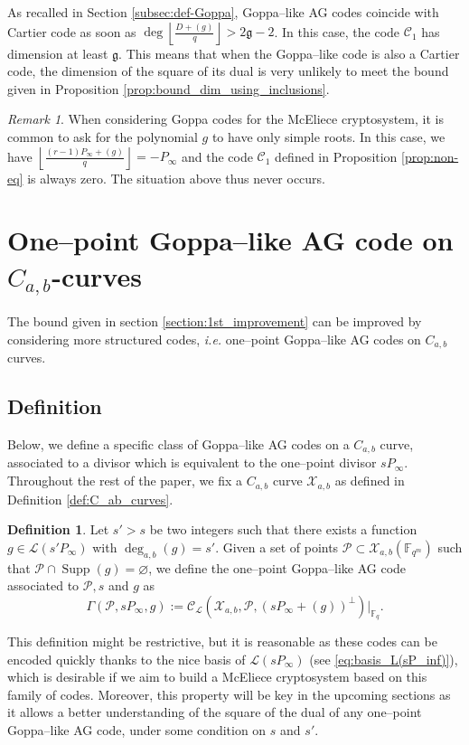 \documentclass[a4paper]{amsart}
\theoremstyle{definition}
\newtheorem{definition}[thm]{Definition}
\theoremstyle{remark}
\newtheorem{remark}[thm]{Remark}
\newcommand{\calP}{\mathcal{P}}
\newcommand{\calL}{\mathcal{L}}
\newcommand{\calC}{\mathcal{C}}
\newcommand{\calX}{\mathcal{X}}
\newcommand{\fq}{\mathbb{F}_{q}}
\newcommand{\F}{\mathbb{F}}
\newcommand{\Supp}{\operatorname{Supp}}
\newcommand{\degab}[1]{\deg_{a,b}\left(#1\right)}
\begin{document}
As recalled in Section \ref{subsec:def-Goppa}, Goppa--like AG codes coincide with Cartier code as soon as $\deg \left\lfloor \frac{D+(g)}{q} \right\rfloor > 2 \mathfrak{g}-2$. In this case, the code $\calC_1$ has dimension at least $\mathfrak{g}$. This means that when the Goppa--like code is also a Cartier code, the dimension of the square of its dual is very unlikely to meet the bound given in Proposition \ref{prop:bound_dim_using_inclusions}.

\begin{remark}
	When considering Goppa codes for the McEliece cryptosystem, it is common to ask for the polynomial $g$ to have only simple roots. In this case, we have $ \left\lfloor \frac{(r-1)P_\infty+(g)}{q} \right\rfloor = -P_\infty$ and the code $\calC_1$ defined in Proposition \ref{prop:non-eq} is always zero. The situation above thus never occurs.
\end{remark}

\section{One--point Goppa--like AG code on $C_{a,b}$-curves}\label{sec:AG-C_a,b}
The bound given in section \ref{section:1st_improvement} can be improved by considering more structured codes, \emph{i.e.} one--point Goppa--like AG codes on $C_{a,b}$ curves.
\subsection{Definition}

Below, we define a specific class of Goppa--like AG codes on a $C_{a,b}$ curve, associated to a divisor which is equivalent to the one--point divisor $sP_\infty$. 
\noindent Throughout the rest of the paper, we fix a $C_{a,b}$ curve $\calX_{a,b}$ as defined in Definition \ref{def:C_ab_curves}.
\begin{definition} \label{def:one--point_Goppa--like_AG_codes_on_C_a,b_curves}
Let $s'>s$ be two integers such that there exists a function $g \in \calL(s'P_\infty)$ with $\degab{g}=s'$. Given a set of points  $\calP \subset \calX_{a,b}(\F_{q^m})$ such that $\calP \cap \Supp(g) = \varnothing$, we define the one--point Goppa--like AG code associated to $\calP,s$ and $g$ as 
\[\Gamma(\calP,sP_\infty,g) := \calC_{\calL}(\calX_{a,b},\calP,(sP_\infty+(g))^{\perp})|_{\fq}.\]
\end{definition}
This definition might be restrictive, but it is reasonable as these codes can be encoded quickly thanks to the nice basis of $\calL(sP_\infty)$ (see \eqref{eq:basis_L(sP_inf)}), which is desirable if we aim to build a McEliece cryptosystem based on this family of codes. Moreover, this property will be key in the upcoming sections as it allows a better understanding of the square of the dual of any one--point Goppa--like AG code, under some condition on $s$ and $s'$. \\
\end{document}
